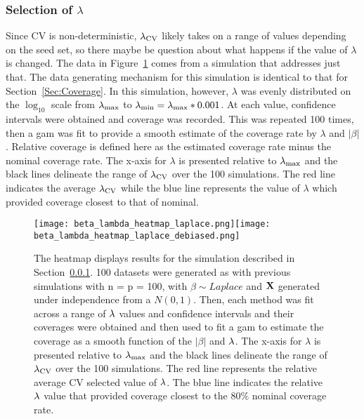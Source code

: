 \subsubsection{Selection of \texorpdfstring{$\lambda$}{lambda}} \label{Sec:lambda}

Since CV is non-deterministic, $\lambda_{\textrm{CV}}$ likely takes on a range of values depending on the seed set, so there maybe be question about what happens if the value of $\lambda$ is changed. The data in Figure~\ref{Fig:beta_lambda_heatmap_laplace} comes from a simulation that addresses just that. The data generating mechanism for this simulation is identical to that for Section~\ref{Sec:Coverage}. In this simulation, however, $\lambda$ was evenly distributed on the $\log_{10}$ scale from $\lambda_{\max}$ to $\lambda_{\min} = \lambda_{\max} * 0.001$. At each value, confidence intervals were obtained and coverage was recorded. This was repeated 100 times, then a gam was fit to provide a smooth estimate of the coverage rate by $\lambda$ and $|\beta|$. Relative coverage is defined here as the estimated coverage rate minus the nominal coverage rate. The x-axis for $\lambda$ is presented relative to $\lambda_{\max}$ and the black lines delineate the range of $\lambda_{\textrm{CV}}$ over the 100 simulations. The red line indicates the average $\lambda_{\textrm{CV}}$ while the blue line represents the value of $\lambda$ which provided coverage closest to that of nominal.

\begin{figure}[hbtp]
  \begin{center}
  \texttt{[image: beta\_lambda\_heatmap\_laplace.png]}\texttt{[image: beta\_lambda\_heatmap\_laplace\_debiased.png]}
  \caption{\label{Fig:beta_lambda_heatmap_laplace} The heatmap displays results for the simulation described in Section~\ref{Sec:lambda}. 100 datasets were generated as with previous simulations with n = p = 100, with $\beta \sim Laplace$ and $\mathbf{X}$ generated under independence from a $N(0,1)$. Then, each method was fit across a range of $\lambda$ values and confidence intervals and their coverages were obtained and then used to fit a gam to estimate the coverage as a smooth function of the $|\beta|$ and $\lambda$. The x-axis for $\lambda$ is presented relative to $\lambda_{\max}$ and the black lines delineate the range of $\lambda_{\textrm{CV}}$ over the 100 simulations. The red line represents the relative average CV selected value of $\lambda$. The blue line indicates the relative $\lambda$ value that provided coverage closest to the 80\% nominal coverage rate.}
  \end{center}
\end{figure}

